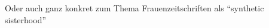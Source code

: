 \begin{comment}
      "By contrast, it was by opposing a social capitalism planned and supervised by the state - treated as obsolete, cramped and constraining - and leaning on the artistic critique (autonomy and creativity) that the new spirit of capitalism gradually took shape at the end of the crisis of the 1960s and 1970s, and undertook to restore the prestige of capitalism. Turning its back on the social demands that had dominated the first half of the 1970s, the new spirit was receptive to the critiques of the period that denounced the mechanization of the world (post-industrial society against industrial society) - the destruction of forms of life conductive to the fulfilment of specifically human potential and, in particular, creativity - and stressed the intolerable character of the .. of oppression which, without necessarily deriving directly from historical capitalism, had been exploited by capitalis mechanisms for organizing .." (p.201)
      "By adapting these sets of demands to the description of a new, liberated and even libertarian way of making profit - which was also said to allow for realization of the self and its most personal aspirations.." (p.201)
      "By helping to overthrow the conventions bound up with the old domestic world, and also to overcome the inflexibilities of the industrial order - bureaucratic hierarchies and standardized production - the artistic critique opened up an opportunity for capitalism to base itself on new forms of control and commodify new, more individualized and 'authentic' goods." (p.467, The Test of the Artistic Critique)
\end{comment}


Oder auch ganz konkret zum Thema Frauenzeitschriften als ``synthetic sisterhood''

